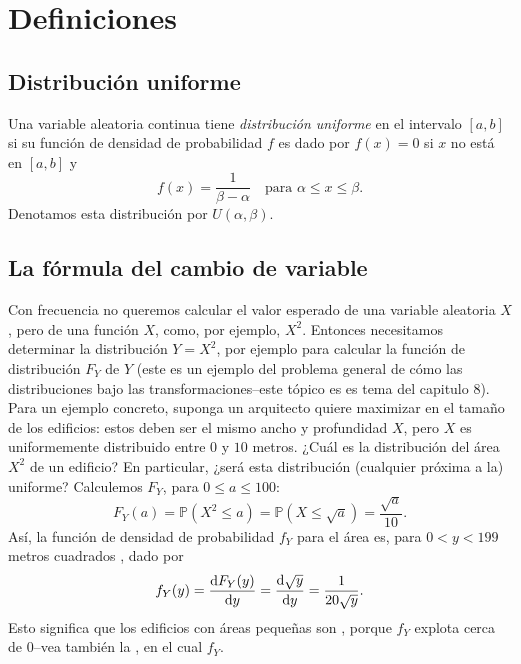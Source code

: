 \section{Definiciones}
\label{sec:defi}

\subsection{Distribución uniforme}

\begin{definition}
	Una variable aleatoria continua tiene \textit{distribución uniforme} en el intervalo $\left[a,b\right]$ si su función de densidad de probabilidad $f$ es dado por $f(x)=0$ si $x$ no está en $\left[a,b\right]$ y
	\begin{equation*}
		f(x)=\frac{1}{\beta-\alpha}\quad\text{para }\alpha \le x\le \beta.
	\end{equation*}
	Denotamos esta distribución por $U\left(\alpha,\beta\right)$.
\end{definition}

\subsection{La fórmula del cambio de variable}
\label{sec:change}

Con frecuencia no queremos calcular el valor esperado de una variable aleatoria $X$, pero %
de una función $X$, como, por ejemplo, $X^2$. Entonces necesitamos determinar la distribución $Y=X^2$, por ejemplo para calcular la función de distribución $F_Y$ de $Y$ (este es un ejemplo del problema general de cómo las distribuciones bajo las transformaciones--este tópico es es tema del capitulo 8). Para un ejemplo concreto, suponga un arquitecto quiere maximizar %
en el tamaño de los edificios: estos deben ser el mismo ancho y profundidad $X$, pero $X$ es uniformemente distribuido entre $0$ y $10$ metros. ¿Cuál es la distribución del área $X^2$ de un edificio? En particular, ¿será esta distribución (cualquier próxima a la) uniforme? Calculemos $F_Y$, para $0\le a\le 100$:
\begin{equation*}
	F_Y(a)=\mathds{P}\left(X^2\le a\right)=\mathds{P}\left(X\le\sqrt{a}\right)=\frac{\sqrt{a}}{10}.
\end{equation*}
Así, la función de densidad de probabilidad $f_Y$ para el área es, para $0<y<199$ metros cuadrados %
, dado por
\begin{equation*}
	f_Y(y)=\diff{F_Y(y)}{y}=\diff{\sqrt{y}}{y}=\frac{1}{20\sqrt{y}}.
\end{equation*}
Esto significa que los edificios con áreas pequeñas son %
, porque $f_Y$ explota cerca de 0--vea también la %
, en el cual %
$f_Y$.

